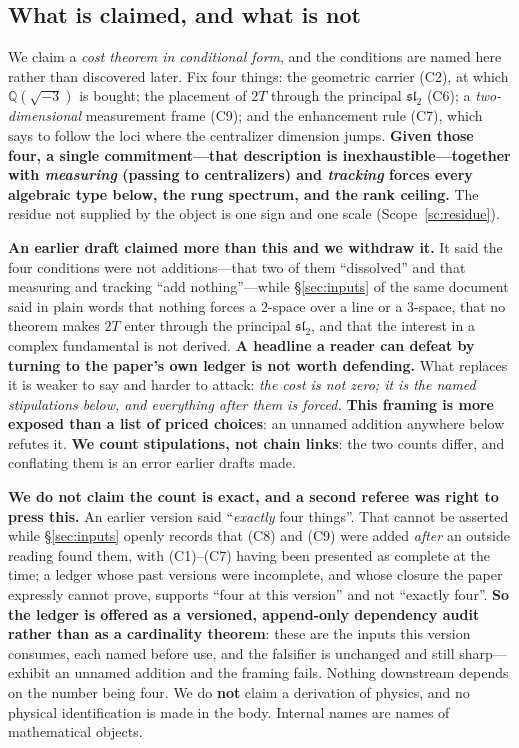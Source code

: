 \documentclass[11pt,reqno]{amsart}
\theoremstyle{plain}
\theoremstyle{definition}
\theoremstyle{remark}
\newcommand{\Q}{\mathbb{Q}}
\newcommand{\sll}{\mathfrak{sl}}
\begin{document}
\subsection{What is claimed, and what is not}
We claim a \emph{cost theorem in conditional form}, and the conditions are named here
rather than discovered later. Fix four things: the geometric carrier (C2), at which
$\Q(\sqrt{-3})$ is bought; the placement of $2T$ through the principal $\sll_2$ (C6); a
\emph{two-dimensional} measurement frame (C9); and the enhancement rule (C7), which says
to follow the loci where the centralizer dimension jumps. \textbf{Given those four, a
single commitment---that description is inexhaustible---together with \emph{measuring}
(passing to centralizers) and \emph{tracking} forces every algebraic type below, the
rung spectrum, and the rank ceiling.} The residue not supplied by the object is one sign
and one scale (Scope~\ref{sc:residue}).

\textbf{An earlier draft claimed more than this and we withdraw it.} It said the four
conditions were not additions---that two of them ``dissolved'' and that measuring and
tracking ``add nothing''---while \S\ref{sec:inputs} of the same document said in plain
words that nothing forces a $2$-space over a line or a $3$-space, that no theorem makes
$2T$ enter through the principal $\sll_2$, and that the interest in a complex
fundamental is not derived. \textbf{A headline a reader can defeat by turning to the
paper's own ledger is not worth defending.} What replaces it is weaker to say and harder
to attack: \emph{the cost is not zero; it is the named stipulations below, and everything
after them is forced.} \textbf{This framing is more exposed than a list of priced choices}:
an unnamed addition anywhere below refutes it.
\textbf{We count stipulations, not chain links}: the two counts differ, and conflating
them is an error earlier drafts made.

\textbf{We do not claim the count is exact, and a second referee was right to press this.}
An earlier version said ``\emph{exactly} four things''. That cannot be asserted while
\S\ref{sec:inputs} openly records that (C8) and (C9) were added \emph{after} an outside
reading found them, with (C1)--(C7) having been presented as complete at the time; a
ledger whose past versions were incomplete, and whose closure the paper expressly cannot
prove, supports ``four at this version'' and not ``exactly four''. \textbf{So the ledger is
offered as a versioned, append-only dependency audit rather than as a cardinality
theorem}: these are the inputs this version consumes, each named before use, and the
falsifier is unchanged and still sharp---exhibit an unnamed addition and the framing
fails. Nothing downstream depends on the number being four. We do \textbf{not} claim a derivation of physics, and no physical identification
is made in the body. Internal names are names of mathematical objects.
\end{document}
